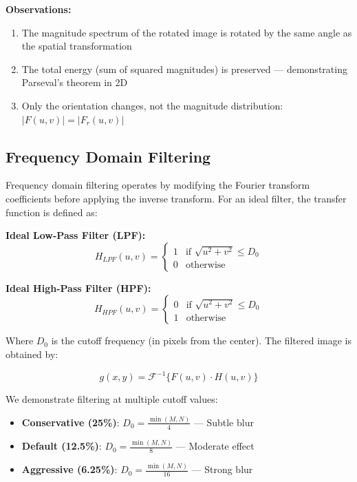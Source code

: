 \documentclass[12pt,a4paper]{article}
\begin{document}
\bigskip
\textbf{Observations:}
\begin{enumerate}
    \item The magnitude spectrum of the rotated image is rotated by the same angle as the spatial transformation
    \item The total energy (sum of squared magnitudes) is preserved --- demonstrating Parseval's theorem in 2D
    \item Only the orientation changes, not the magnitude distribution: $|F(u,v)| = |F_r(u,v)|$
\end{enumerate}

\bigskip
\subsection{Frequency Domain Filtering}
Frequency domain filtering operates by modifying the Fourier transform coefficients before applying the inverse transform. For an ideal filter, the transfer function is defined as:

\bigskip
\textbf{Ideal Low-Pass Filter (LPF):}
\begin{equation}
    H_{LPF}(u,v) =
    \begin{cases}
        1 & \text{if } \sqrt{u^2 + v^2} \leq D_0 \\
        0 & \text{otherwise}
    \end{cases}
    \label{eq:lpf}
\end{equation}

\bigskip
\textbf{Ideal High-Pass Filter (HPF):}
\begin{equation}
    H_{HPF}(u,v) =
    \begin{cases}
        0 & \text{if } \sqrt{u^2 + v^2} \leq D_0 \\
        1 & \text{otherwise}
    \end{cases}
    \label{eq:hpf}
\end{equation}

\bigskip
Where $D_0$ is the cutoff frequency (in pixels from the center). The filtered image is obtained by:

\bigskip
\begin{equation}
    g(x,y) = \mathcal{F}^{-1}\{F(u,v) \cdot H(u,v)\}
    \label{eq:filtering}
\end{equation}

\bigskip
We demonstrate filtering at multiple cutoff values:
\begin{itemize}
    \item \textbf{Conservative (25\%)}: $D_0 = \frac{\min(M,N)}{4}$ --- Subtle blur
    \item \textbf{Default (12.5\%)}: $D_0 = \frac{\min(M,N)}{8}$ --- Moderate effect
    \item \textbf{Aggressive (6.25\%)}: $D_0 = \frac{\min(M,N)}{16}$ --- Strong blur
\end{itemize}
\end{document}
